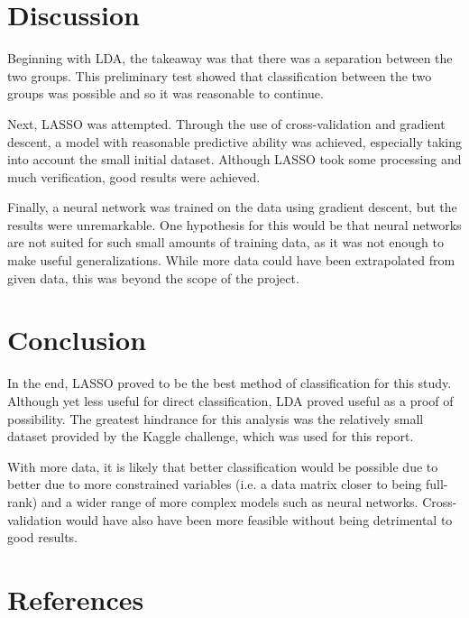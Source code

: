 \documentclass{article}
\begin{document}
\section{Discussion}
Beginning with LDA, the takeaway was that there was a separation between the two groups. This preliminary test showed that classification between the two groups was possible and so it was reasonable to continue.

Next, LASSO was attempted. Through the use of cross-validation and gradient descent, a model with reasonable predictive ability was achieved, especially taking into account the small initial dataset. Although LASSO took some processing and much verification, good results were achieved.

Finally, a neural network was trained on the data using gradient descent, but the results were unremarkable. One hypothesis for this would be that neural networks are not suited for such small amounts of training data, as it was not enough to make useful generalizations. While more data could have been extrapolated from given data, this was beyond the scope of the project. 

\section{Conclusion}
In the end, LASSO proved to be the best method of classification for this study. Although yet less useful for direct classification, LDA proved useful as a proof of possibility. The greatest hindrance for this analysis was the relatively small dataset provided by the Kaggle challenge, which was used for this report. 

With more data, it is likely that better classification would be possible due to better due to more constrained variables (i.e. a data matrix closer to being full-rank) and a wider range of more complex models such as neural networks. Cross-validation would have also have been more feasible without being detrimental to good results.

\newpage
\section{References}
\printbibliography[heading=none]
\end{document}
